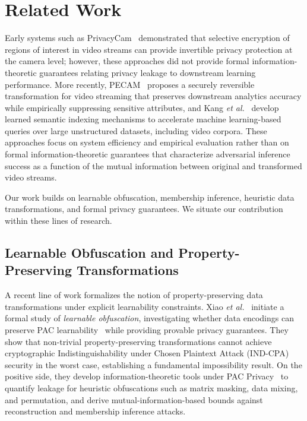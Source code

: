 \documentclass[sigconf,anonymous, review]{acmart}
\begin{document}
\section{Related Work}
 Early systems such as PrivacyCam~\cite{chattopadhyay2007privacycam} demonstrated that selective encryption of regions of interest in video streams can provide invertible privacy protection at the camera level; however, these approaches did not provide formal information-theoretic guarantees relating privacy leakage to downstream learning performance. More recently, PECAM~\cite{wu2021pecam} proposes a securely reversible transformation for video streaming that preserves downstream analytics accuracy while empirically suppressing sensitive attributes, and Kang \textit{et al.}~\cite{kang2020semantic} develop learned semantic indexing mechanisms to accelerate machine learning-based queries over large unstructured datasets, including video corpora. These approaches focus on system efficiency and empirical evaluation rather than on formal information-theoretic guarantees that characterize adversarial inference success as a function of the mutual information between original and transformed video streams.

Our work builds on learnable obfuscation, membership inference, heuristic data transformations, and formal privacy guarantees. We situate our contribution within these lines of research.

\subsection{Learnable Obfuscation and Property-Preserving Transformations}

A recent line of work formalizes the notion of property-preserving data transformations under explicit learnability constraints. Xiao \textit{et al.}~\cite{xiao2024formal} initiate a formal study of \emph{learnable obfuscation}, investigating whether data encodings can preserve PAC learnability~\cite{valiant1984theory} while providing provable privacy guarantees. They show that non-trivial property-preserving transformations cannot achieve cryptographic Indistinguishability under Chosen Plaintext Attack (IND-CPA) security in the worst case, establishing a fundamental impossibility result. On the positive side, they develop information-theoretic tools under PAC Privacy~\cite{xiao2023pacprivacy} to quantify leakage for heuristic obfuscations such as matrix masking, data mixing, and permutation, and derive mutual-information-based bounds against reconstruction and membership inference attacks.
\end{document}

